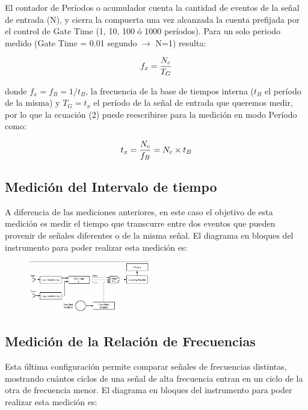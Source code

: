 \documentclass{article}
\begin{document}
	El contador de Períodos o acumulador cuenta la cantidad de eventos de la señal de entrada (N), y cierra la compuerta una vez alcanzada la cuenta prefijada por el control de Gate Time (1, 10, 100 ó 1000 períodos). Para un solo periodo medido (Gate Time = 0.01 segundo $\rightarrow$ N=1) resulta:
\medskip

\begin{equation}
	f_x = {N_c \over T_G}
\end{equation}
\medskip

\noindent donde $f_x = f_B = 1/t_B$, la frecuencia de la base de tiempos interna ($t_B$ el período de la misma) y $T_G = t_x$ el período de la señal de entrada que queremos medir, por lo que la ecuación (2) puede reescribirse para la medición en modo Período como:
\medskip

\begin{equation}
	t_x = {N_c \over f_B} = N_c \times t_B
\end{equation}
\bigskip\bigskip



\subsection{Medición del Intervalo de tiempo}
	
	A diferencia de las mediciones anteriores, en este caso el objetivo de esta medición es medir el tiempo que transcurre entre dos eventos que pueden provenir de señales diferentes o de la misma señal.
	\medskip
	El diagrama en bloques del instrumento para poder realizar esta medición es:
	
	\begin{figure}[h]
		\centering
		\includegraphics[width=0.47\textwidth]{images/diagramaBloquesIntervaloContador.jpg}
		\medskip
	\end{figure}
	\bigskip\bigskip
	
\subsection{Medición de la Relación de Frecuencias} 
	\medskip
	Esta última configuración permite comparar señales de frecuencias distintas, mostrando cuántos ciclos de una señal de alta frecuencia entran en un ciclo de la otra de frecuencia menor.
	\medskip
	El diagrama en bloques del instrumento para poder realizar esta medición es:
	
\end{document}
